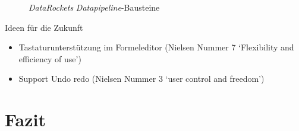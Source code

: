 \documentclass[
  language=german, %
  type=bachelor,%
  ngerman
]{isthesis}
\begin{document}
\begin{content}

  \begin{figure}
    \caption{\textit{DataRockets} \textit{Datapipeline}-Bausteine}\label{}
  \end{figure}

	Ideen für die Zukunft
	\begin{itemize}
    \item Tastaturunterstützung im Formeleditor (Nielsen Nummer 7 `Flexibility
      and efficiency of use')
    \item Support Undo redo (Nielsen Nummer 3 `user control and freedom')
	\end{itemize}

\chapter{Fazit}\label{ch:fazit}



  

\end{content}



%  







\end{document}
